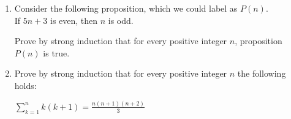 \documentclass[12pt]{article}
\begin{document}
  
\pagestyle{empty}
 




\vskip0.5in






\begin{enumerate}


\item 
Consider the following proposition, which we could label as $P(n)$. \\
 If $5n+3$ is even, then $n$ is odd. 

Prove by strong induction that for every positive integer $n$, proposition $P(n)$ is true. 


{\color{blue}

}




\newpage

\item Prove by strong induction that for every positive integer $n$ the following holds: 

$\sum\limits_{k=1}^n k(k{+}1) = \frac{n(n{+}1)(n{+}2)}{3}$

{\color{blue}

}












\end{enumerate} 
\end{document}
